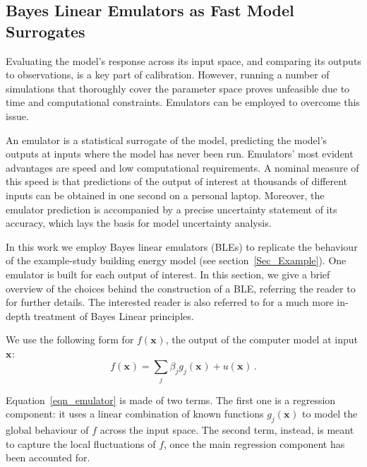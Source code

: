 \documentclass[preprint,12pt, sort&compress]{elsarticle}
\newcommand{\bd}[1]{\boldsymbol{#1}}
\newcommand{\x}[1][]{\bd{x_{#1}}}
\begin{document}

\subsection{Bayes Linear Emulators as Fast Model Surrogates}\label{Subsec_Emulators}

Evaluating the model’s response across its input space, and comparing its outputs to observations, is a key part of calibration. However, running a number of simulations that thoroughly cover the parameter space proves unfeasible due to time and computational constraints. Emulators can be employed to overcome this issue.

An emulator is a statistical surrogate of the model, predicting the model’s outputs at inputs where the model has never been run. Emulators’ most evident advantages are speed and low computational requirements. A nominal measure of this speed is that predictions of the output of interest at thousands of different inputs can be obtained in one second on a personal laptop. Moreover, the emulator prediction is accompanied by a precise uncertainty statement of its accuracy, which lays the basis for model uncertainty analysis.

In this work we employ Bayes linear emulators (BLEs) to replicate the behaviour of the example-study building energy model (see section~\ref{Sec_Example}). One emulator is built for each output of interest. In this section, we give a brief overview of the choices behind the construction of a BLE, referring the reader to \cite{goldstein2017, vernon2010galaxy} for further details. The interested reader is also referred to \cite{BLS2007} for a much more in-depth treatment of Bayes Linear principles. 

We use the following form for $f(\x)$, the output of the computer model at input $\x$:
\begin{equation}\label{eqn_emulator}
f(\x) = \sum_j \beta_j g_j(\x) + u(\x)\,.
\end{equation}

Equation~\eqref{eqn_emulator} is made of two terms. The first one is a regression component: it uses a linear combination of known functions $g_j(\x)$ to model the global behaviour of $f$ across the input space. The second term, instead, is meant to capture the local fluctuations of $f$, once the main regression component has been accounted for. 
\end{document}
